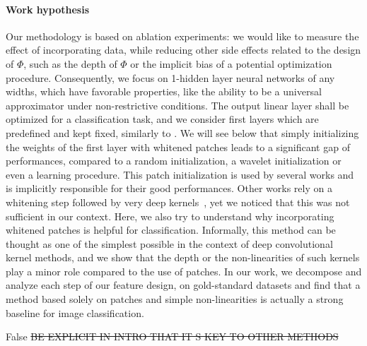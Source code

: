 \documentclass{article} %
\newcommand{\Edouard}[1]{\textcolor{blue}{#1}}
\begin{document}
\paragraph{Work hypothesis}Our  methodology is based on ablation experiments: we would like to measure the effect of incorporating data, while reducing other side effects related to the design of $\Phi$, such as the depth of $\Phi$ or the implicit bias of a potential optimization procedure. Consequently, we focus on 1-hidden layer neural networks of any widths, which have favorable properties, like the ability to be a universal approximator under non-restrictive conditions. The output linear layer shall be optimized for a classification task, and we consider first layers which are predefined and kept fixed, similarly to \cite{coates2011analysis}. 
We will see below that simply initializing the weights of the first layer with whitened patches leads to a significant gap of performances, compared to a random  initialization, a wavelet initialization or even a learning procedure. This patch initialization is used by several works \citep{li2019enhanced,mairal2016end} and is implicitly responsible for their good performances. Other works rely on a whitening step followed by very deep kernels~\citep{shankar2020neural}, yet we noticed that this was not sufficient in our context. Here, we also try to understand why incorporating whitened patches is helpful for classification.
Informally, this method can be thought as one of the simplest possible in the context of deep convolutional kernel methods, and we show that the depth or the non-linearities of such kernels play a minor role compared to the use of patches. 
In our work, we decompose and analyze each step of our feature design, on gold-standard datasets and find that a method based solely on patches and simple non-linearities is actually a strong baseline for image classification. 

\if False
\sout{BE EXPLICIT IN INTRO THAT IT S KEY TO OTHER METHODS}
\end{document}
